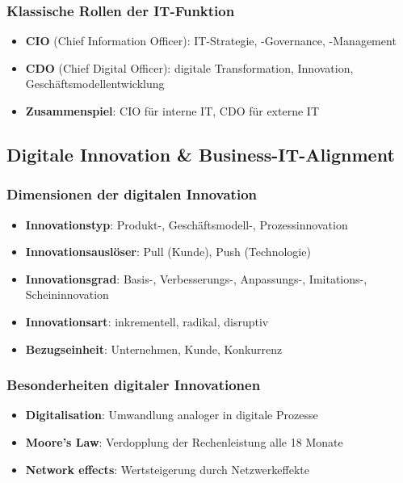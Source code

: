 \documentclass{article}
\begin{document}
\subsubsection{Klassische Rollen der IT-Funktion}
\begin{itemize}
  \item \textbf{CIO} (Chief Information Officer): IT-Strategie, -Governance, -Management
  \item \textbf{CDO} (Chief Digital Officer): digitale Transformation, Innovation, Geschäftsmodellentwicklung
  \item \textbf{Zusammenspiel}: CIO für interne IT, CDO für externe IT
\end{itemize}


\subsection{Digitale Innovation \& Business-IT-Alignment}
\subsubsection{Dimensionen der digitalen Innovation}
\begin{itemize}
  \item \textbf{Innovationstyp}: Produkt-, Geschäftsmodell-, Prozessinnovation
  \item \textbf{Innovationsauslöser}: Pull (Kunde), Push (Technologie)
  \item \textbf{Innovationsgrad}: Basis-, Verbesserungs-, Anpassungs-, Imitations-, Scheininnovation
  \item \textbf{Innovationsart}: inkrementell, radikal, disruptiv
  \item \textbf{Bezugseinheit}: Unternehmen, Kunde, Konkurrenz
\end{itemize}

\subsubsection{Besonderheiten digitaler Innovationen}
\begin{itemize}
  \item \textbf{Digitalisation}: Umwandlung analoger in digitale Prozesse
  \item \textbf{Moore's Law}: Verdopplung der Rechenleistung alle 18 Monate
  \item \textbf{Network effects}: Wertsteigerung durch Netzwerkeffekte
\end{itemize}
\end{document}
